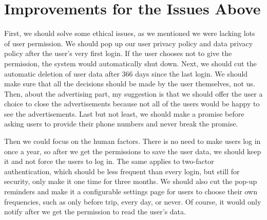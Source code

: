\documentclass[12pt]{article}
\begin{document}
\section{Improvements for the Issues Above}

First, we should solve some ethical issues, as we mentioned we were lacking lots of user permission. We should pop up our user privacy policy and data privacy policy after the user's very first login. If the user chooses not to give the permission, the system would automatically shut down. Next, we should cut the automatic deletion of user data after 366 days since the last login. We should make sure that all the decisions should be made by the user themselves, not us. Then, about the advertising part, my suggestion is that we should offer the user a choice to close the advertisements because not all of the users would be happy to see the advertisements. Last but not least, we should make a promise before asking users to provide their phone numbers and never break the promise.

Then we could focus on the human factors. There is no need to make users log in once a year, so after we get the permissions to save the user data, we should keep it and not force the users to log in. The same applies to two-factor authentication, which should be less frequent than every login, but still for security, only make it one time for three months. We should also cut the pop-up reminders and make it a configurable settings page for users to choose their own frequencies, such as only before trip, every day, or never. Of course, it would only notify after we get the permission to read the user's data.



\end{document}
